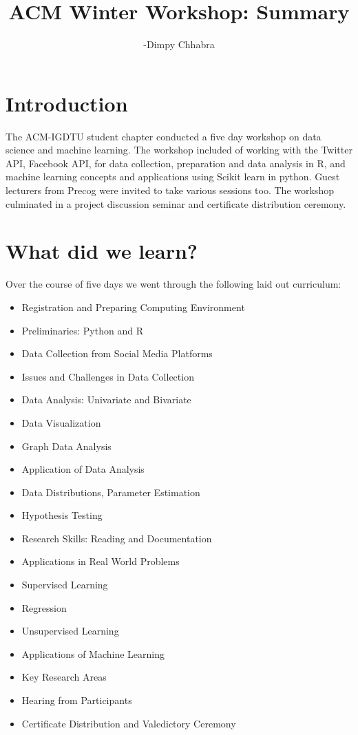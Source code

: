 \documentclass[a4paper]{article}
\title{ACM Winter Workshop: Summary}
\author{-Dimpy Chhabra}
\begin{document}
\maketitle

\section{Introduction}
The ACM-IGDTU student chapter conducted a five day workshop on data science and machine learning. 
The workshop included of working with the Twitter API, Facebook API, for data collection, preparation and data analysis in R, and machine learning concepts and applications using Scikit learn in python.
Guest lecturers from Precog were invited to take various sessions too.
The workshop culminated in a project discussion seminar and certificate distribution ceremony.

\section{What did we learn?}
Over the course of five days we went through the following laid out curriculum:

\begin{itemize}
\item Registration and Preparing Computing Environment
\item Preliminaries: Python and R
\item Data Collection from Social Media Platforms
\item Issues and Challenges in Data Collection
\item Data Analysis: Univariate and Bivariate
\item Data Visualization
\item Graph Data Analysis
\item Application of Data Analysis
\item Data Distributions, Parameter Estimation
\item Hypothesis Testing
\item Research Skills: Reading and Documentation
\item Applications in Real World Problems
\item Supervised Learning
\item Regression
\item Unsupervised Learning
\item Applications of Machine Learning
\item Key Research Areas
\item Hearing from Participants
\item Certificate Distribution and Valedictory Ceremony
\end{itemize}
\end{document}
